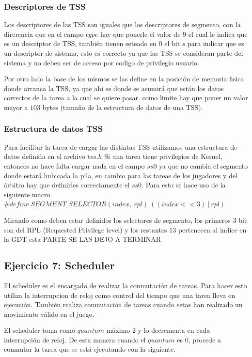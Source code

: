 \documentclass[a4paper,10pt,twoside]{article}
\begin{document}
\subsubsection{Descriptores de TSS}
Los descriptores de las TSS son iguales que los descriptores de segmento, con la direrencia que en el campo $type$ hay que ponerle el valor de $9$ el cual le indica que es un descriptor de TSS, también tienen seteado en $0$ el bit $s$ para indicar que es un descriptor de sistema, esto es correcto ya que las TSS se consideran parte del sistema y no deben ser de acceso por codigo de privilegio usuario.

Por otro lado la base de los mismos se las define en la posición de memoria fisica donde arranca la TSS, ya que ahi es donde se asumirá que están los datos correctos de la tarea a la cual se quiere pasar. como limite hay que poner un valor mayor a  $103$ bytes (tamaño de la estructura de datos de una TSS).
\subsubsection{Estructura de datos TSS}
Para facilitar la tarea de cargar las distintas TSS utilizamos una estructura de datos definida en el archivo $tss.h$
Si una tarea tiene privilegios de Kernel, entonces no hace falta cargar nada en el campo $ss0$ ya que no cambia el segmento donde estará hubicada la pila, en cambio para las tareas de los jugadores y del árbitro hay que definirles correctamente el $ss0$. Para esto se hace uso de la siguiente macro. \\

$\#define\ SEGMENT\_SELECTOR(index,\ rpl)\ ((index << 3)\ |\ rpl)$

Mirando como deben estar definidos los selectores de segmento, los primeros $3$ bit son del RPL (Requested Privilege level) y los restantes $13$ pertenecen al indice en la GDT esta PARTE SE LAS DEJO A TERMINAR


\subsection{Ejercicio 7: Scheduler}

El scheduler es el encargado de realizar la conmutación de tareas. Para hacer esto utiliza la interrupcion de reloj como control del tiempo que una tarea lleva en ejecución. También realiza conmutación de tareas cuando estas han realizado un movimiento válido en el juego.

El scheduler toma como $quantum$ máximo 2 y lo decrementa en cada interrupción de reloj. De esta manera cuando el $quantum$ es 0, procede a conmutar la tarea que se está ejecutando con la siguiente.
\end{document}
